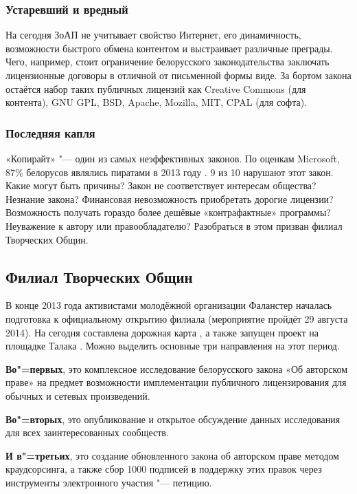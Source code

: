 \documentclass[10pt, a5paper]{article}
\begin{document}
\subsubsection*{Устаревший и вредный}

На сегодня ЗоАП не учитывает свойство Интернет, его динамичность, возможности быстрого обмена контентом и выстраивает различные преграды. Чего, например, стоит ограничение белорусского законодательства заключать лицензионные договоры в отличной от письменной формы виде. За бортом закона остаётся набор таких публичных лицензий как Creative Commons (для контента), GNU GPL, BSD, Apache, Mozilla, MIT, CPAL (для софта).

\subsubsection*{Последняя капля}

«Копирайт» "--- один из самых неэффективных законов. По оценкам Microsoft, 87\% белорусов являлись пиратами в 2013 году \cite{Volchak2}. 9 из 10 нарушают этот закон. Какие могут быть причины? Закон не соответствует интересам общества? Незнание закона? Финансовая невозможность приобретать дорогие лицензии? Возможность получать гораздо более дешёвые «контрафактные» программы? Неуважение к автору или правообладателю? Разобраться в этом призван филиал Творческих Общин.

\subsection*{Филиал Творческих Общин}

В конце 2013 года активистами молодёжной организации Фаланстер началась подготовка к официальному открытию филиала (мероприятие пройдёт 29 августа 2014). На сегодня составлена дорожная карта \cite{Volchak3}, а также запущен проект на площадке Талака \cite{Volchak4}. Можно выделить основные три направления на этот период.

\textbf{Во"=первых}, это комплексное исследование белорусского закона «Об авторском праве» на предмет возможности имплементации публичного лицензирования для обычных и сетевых произведений.

\textbf{Во"=вторых}, это опубликование и открытое обсуждение данных исследования для всех заинтересованных сообществ.

\textbf{И в"=третьих}, это создание обновленного закона об авторском праве методом краудсорсинга, а также сбор 1000 подписей в поддержку этих правок через инструменты электронного участия "--- петицию.
\end{document}
